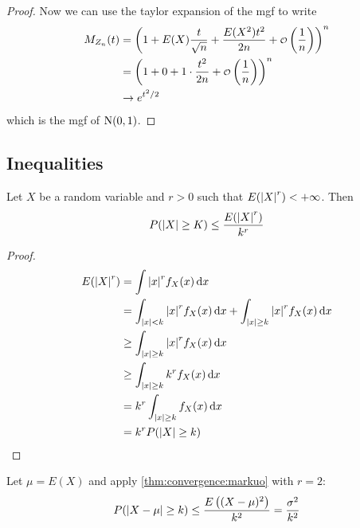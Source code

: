 \documentclass[12pt]{extarticle}
\newcommand{\Normal}{{\operatorfont N}}
\begin{document}
\begin{proof}
    Now we can use the taylor expansion of the mgf to write
    \begin{align}
        M_{Z_n}(t) & = \left(1+E(X) \frac{t}{\sqrt{n}} + \frac{E(X^2) t^2}{2n} + \o\left(\frac{1}{n}\right)\right)^n \\
                   & = \left(1 + 0 + 1 \cdot \frac{t^2}{2n} + \o\left(\frac{1}{n}\right)\right)^n                    \\
                   & \to e^{t^2 / 2}
    \end{align}
    which is the mgf of $\Normal(0, 1)$.
\end{proof}

\subsection{Inequalities}

\begin{theorem}
    \label{thm:convergence:markuo}
    Let $X$ be a random variable and $r > 0$ such that $E(\abs{X}^r) < + \infty$.
    Then
    \begin{equation}
        P(\abs{X} \geq K) \leq \frac{E(\abs{X}^r)}{k^r}
    \end{equation}
\end{theorem}

\begin{proof}
    \begin{align}
        E(\abs{X}^r) & = \int \abs{x}^r f_X (x) \dd{x}                                                                \\
                     & = \int_{\abs{x} < k} \abs{x}^r f_X (x) \dd{x} + \int_{\abs{x} \geq k} \abs{x}^r f_X (x) \dd{x} \\
                     & \geq \int_{\abs{x} \geq k} \abs{x}^r f_X (x) \dd{x}                                            \\
                     & \geq \int_{\abs{x} \geq k} k^r f_X (x) \dd{x}                                                  \\
                     & = k^r \int_{\abs{x} \geq k} f_X (x) \dd{x}                                                     \\
                     & = k^r P(\abs{X} \geq k)
    \end{align}
\end{proof}

\begin{theorem}
    \label{thm:convergence:chebyshev}
    Let $\mu = E(X)$ and apply \autoref{thm:convergence:markuo} with $r = 2$:
    \begin{equation}
        P(\abs{X - \mu} \geq k) \leq \frac{E\left((X - \mu)^2\right)}{k^2} = \frac{\sigma^2}{k^2}
    \end{equation}
\end{theorem}
\end{document}

